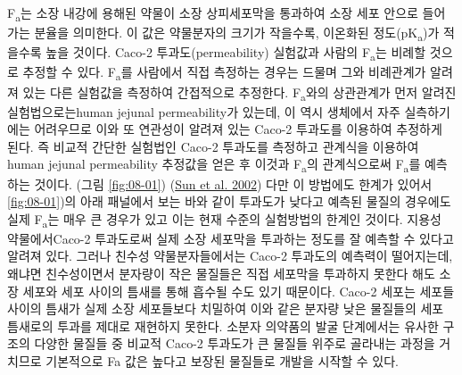 \documentclass[
  11pt,
  krantz2, a4paper, twoside]{krantz}
\begin{document}
F\textsubscript{a}는 소장 내강에 용해된 약물이 소장 상피세포막을 통과하여 소장 세포 안으로 들어가는 분율을 의미한다.
이 값은 약물분자의 크기가 작을수록, 이온화된 정도(pK\textsubscript{a})가 적을수록 높을 것이다.
Caco-2 투과도(permeability) 실험값과 사람의 F\textsubscript{a}는 비례할 것으로 추정할 수 있다.
F\textsubscript{a}를 사람에서 직접 측정하는 경우는 드물며 그와 비례관계가 알려져 있는 다른 실험값을 측정하여 간접적으로 추정한다.
F\textsubscript{a}와의 상관관계가 먼저 알려진 실험법으로는human jejunal permeability가 있는데, 이 역시 생체에서 자주 실측하기에는 어려우므로 이와 또 연관성이 알려져 있는 Caco-2 투과도를 이용하여 추정하게 된다.
즉 비교적 간단한 실험법인 Caco-2 투과도를 측정하고 관계식을 이용하여 human jejunal permeability 추정값을 얻은 후 이것과 F\textsubscript{a}의 관계식으로써 F\textsubscript{a}를 예측하는 것이다. (그림 \ref{fig:08-01}) (\protect\hyperlink{ref-sun2002comparison}{Sun et al. 2002})
다만 이 방법에도 한계가 있어서 \ref{fig:08-01})의 아래 패널에서 보는 바와 같이 투과도가 낮다고 예측된 물질의 경우에도 실제 F\textsubscript{a}는 매우 큰 경우가 있고 이는 현재 수준의 실험방법의 한계인 것이다.
지용성 약물에서Caco-2 투과도로써 실제 소장 세포막을 투과하는 정도를 잘 예측할 수 있다고 알려져 있다.
그러나 친수성 약물분자들에서는 Caco-2 투과도의 예측력이 떨어지는데, 왜냐면 친수성이면서 분자량이 작은 물질들은 직접 세포막을 투과하지 못한다 해도 소장 세포와 세포 사이의 틈새를 통해 흡수될 수도 있기 때문이다.
Caco-2 세포는 세포들 사이의 틈새가 실제 소장 세포들보다 치밀하여 이와 같은 분자량 낮은 물질들의 세포 틈새로의 투과를 제대로 재현하지 못한다.
소분자 의약품의 발굴 단계에서는 유사한 구조의 다양한 물질들 중 비교적 Caco-2 투과도가 큰 물질들 위주로 골라내는 과정을 거치므로 기본적으로 Fa 값은 높다고 보장된 물질들로 개발을 시작할 수 있다.
\end{document}
